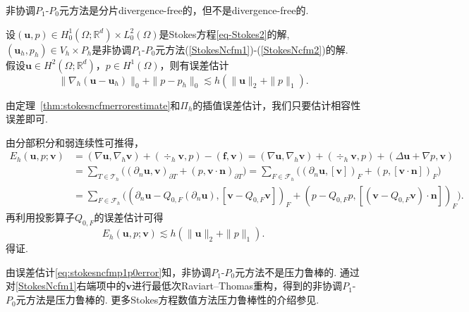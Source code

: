 非协调$P_1$-$P_0$元方法是分片divergence-free的，但不是divergence-free的.

\begin{lemma}
设$(\boldsymbol{u}, p)\in H_0^{1}(\Omega; \mathbb{R}^{d})\times L_{0}^{2}(\Omega)$是Stokes方程\eqref{eq-Stokes2}的解, $(\boldsymbol{u}_h, p_h)\in V_h\times P_h$是非协调$P_1$-$P_0$元方法(\ref{StokesNcfm1})-(\ref{StokesNcfm2})的解. 假设$\boldsymbol{u}\in H^{2}(\Omega; \mathbb{R}^{d})$，$p\in H^{1}(\Omega)$，则有误差估计
\begin{equation}\label{eq:stokesncfmp1p0error}	
\|\nabla_h(\boldsymbol{u}-\boldsymbol{u}_h)\|_0+\|p-p_h\|_0\lesssim h(\|\boldsymbol{u}\|_2+\|p\|_1).
\end{equation}
\end{lemma}
\begin{prf}
由定理~\ref{thm:stokesncfmerrorestimate}和$\Pi_h$的插值误差估计，我们只要估计相容性误差即可.

由分部积分和弱连续性可推得，
\begin{align*}
E_h(\boldsymbol{u},p;\boldsymbol{v})&=(\nabla\boldsymbol{u}, \nabla_h\boldsymbol{v}) + (\div_h\boldsymbol{v}, p) -(\boldsymbol{f},\boldsymbol{v})=(\nabla\boldsymbol{u}, \nabla_h\boldsymbol{v}) + (\div_h\boldsymbol{v}, p) + (\Delta\boldsymbol{u}+\nabla p,\boldsymbol{v}) \\
&=\sum_{T\in\mathcal T_h}\big((\partial_n\boldsymbol{u}, \boldsymbol{v})_{\partial T}+(p, \boldsymbol{v}\cdot\boldsymbol{n})_{\partial T}\big)=\sum_{F\in\mathcal F_h}\big((\partial_n\boldsymbol{u}, [\boldsymbol{v}])_F+(p, [\boldsymbol{v}\cdot\boldsymbol{n}])_F\big) \\
&=\sum_{F\in\mathcal F_h}\big((\partial_n\boldsymbol{u}-Q_{0,F}(\partial_n\boldsymbol{u}), [\boldsymbol{v}-Q_{0,F}\boldsymbol{v}])_F+(p-Q_{0,F}p, [(\boldsymbol{v}-Q_{0,F}\boldsymbol{v})\cdot\boldsymbol{n}])_F\big).
\end{align*}
再利用投影算子$Q_{0,F}$的误差估计可得
\begin{equation*}
E_h(\boldsymbol{u},p;\boldsymbol{v})\lesssim h(\|\boldsymbol{u}\|_2+\|p\|_1).
\end{equation*}
得证.
\end{prf}

由误差估计\eqref{eq:stokesncfmp1p0error}知，非协调$P_1$-$P_0$元方法不是压力鲁棒的.
通过对\eqref{StokesNcfm1}右端项中的$\boldsymbol{v}$进行最低次Raviart–Thomas重构\cite{Linke2014,BrenneckeLinkeMerdonSchoeberl2015}，得到的非协调$P_1$-$P_0$元方法是压力鲁棒的. 更多Stokes方程数值方法压力鲁棒性的介绍参见\cite{JohnLinkeMerdonNeilanEtAl2017}.




